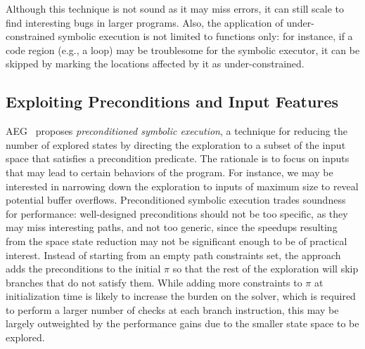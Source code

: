 Although this technique is not sound as it may miss errors, it can still scale to find interesting bugs in larger programs. Also, the application of under-constrained symbolic execution is not limited to functions only: for instance, if a code region (e.g., a loop) may be troublesome for the symbolic executor, it can be skipped by marking the locations affected by it as under-constrained. 

\subsection{Exploiting Preconditions and Input Features}%
\label{precontioned-symbolic-execution}

{\sc AEG}~\cite{AEG-NDSS11} proposes {\em preconditioned symbolic execution}, a technique for reducing the number of explored states by directing the exploration to a subset of the input space that satisfies a precondition predicate. The rationale is to focus on inputs that may lead to certain behaviors of the program.
For instance, we may be interested in narrowing down the exploration to inputs of maximum size to reveal potential buffer overflows. Preconditioned symbolic execution trades soundness for performance: well-designed preconditions should not be too specific, as they may miss interesting paths, and not too generic, since the speedups resulting from the space state reduction may not be significant enough to be of practical interest. Instead of starting from an empty path constraints set, the approach adds the preconditions to the initial $\pi$ so that the rest of the exploration will skip branches that do not satisfy them. While adding more constraints to $\pi$ at initialization time is likely to increase the burden on the solver, which is required to perform a larger number of checks at each branch instruction, this may be largely outweighted by the performance gains due to the smaller state space to be explored.

%



